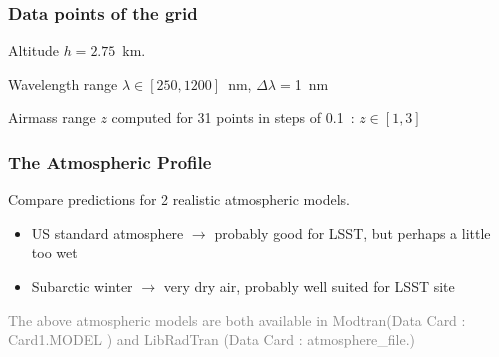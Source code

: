 \documentclass{beamer}
\begin{document}
\begin{frame}
\frametitle{Data points of the grid}
\begin{block}{Altitude}
$h=2.75$~km.
\end{block}

\begin{block}{Wavelength range}
$\lambda \in [250,1200]$~nm, $\Delta \lambda=$1~nm
\end{block}

\begin{block}{Airmass range}
$z$ computed for 31 points in steps of 0.1~: $z \in [1,3]$
\end{block}

\end{frame}


\begin{frame}
\frametitle{The Atmospheric Profile}
Compare predictions for 2 realistic atmospheric models.
\begin{itemize}
\item US standard atmosphere $\rightarrow$ probably good for LSST, but perhaps  a little too wet
\item Subarctic winter $\rightarrow$ very dry air, probably well suited for LSST site
\end{itemize}

\textcolor{gray}{The above atmospheric models are both available in Modtran(Data Card : Card1.MODEL )  and LibRadTran (Data Card : atmosphere\_file.)}

\end{frame}


\end{document}
